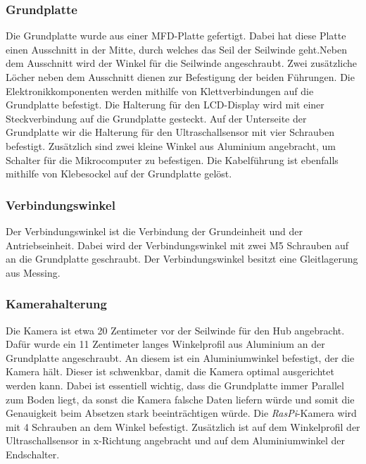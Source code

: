 \documentclass[a4paper]{report}
\begin{document}
\subsubsection{Grundplatte}
\label{sssec:GrundplatteBeschrieb}
Die Grundplatte wurde aus einer MFD-Platte gefertigt. Dabei hat diese Platte einen Ausschnitt in der Mitte, durch welches das Seil der Seilwinde geht.Neben dem Ausschnitt wird der Winkel für die Seilwinde angeschraubt. Zwei zusätzliche Löcher neben dem Ausschnitt dienen zur Befestigung der beiden Führungen. Die Elektronikkomponenten werden mithilfe von Klettverbindungen auf die Grundplatte befestigt. Die Halterung für den LCD-Display wird mit einer Steckverbindung auf die Grundplatte gesteckt. Auf der Unterseite der Grundplatte wir die Halterung für den Ultraschallsensor mit vier Schrauben befestigt. Zusätzlich sind zwei kleine Winkel aus Aluminium angebracht, um Schalter für die Mikrocomputer zu befestigen. Die Kabelführung ist ebenfalls mithilfe von Klebesockel auf der Grundplatte gelöst.



\subsubsection{Verbindungswinkel}
\label{sssec:VerbindungswinkelBeschrieb}
Der Verbindungswinkel ist die Verbindung der Grundeinheit und der Antriebseinheit. Dabei wird der Verbindungswinkel mit zwei M5 Schrauben auf an die Grundplatte geschraubt. Der Verbindungswinkel besitzt eine Gleitlagerung aus Messing.

\subsubsection{Kamerahalterung}
\label{sssec:Kamerahalterung}
Die Kamera ist etwa 20 Zentimeter vor der Seilwinde für den Hub angebracht. Dafür wurde ein 11 Zentimeter langes Winkelprofil aus Aluminium an der Grundplatte angeschraubt. An diesem ist ein Aluminiumwinkel befestigt, der die Kamera hält. Dieser ist schwenkbar, damit die Kamera optimal ausgerichtet werden kann. Dabei ist essentiell wichtig, dass die Grundplatte immer Parallel zum Boden liegt, da sonst die Kamera falsche Daten liefern würde und somit die Genauigkeit beim Absetzen stark beeinträchtigen würde. Die \textit{RasPi}-Kamera wird mit 4 Schrauben an dem Winkel befestigt. Zusätzlich ist auf dem Winkelprofil der Ultraschallsensor in x-Richtung angebracht und auf dem Aluminiumwinkel der Endschalter.
\end{document}
